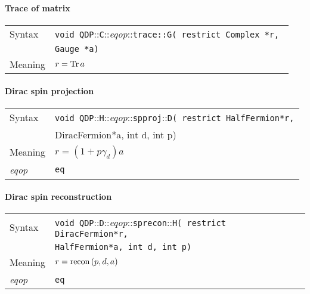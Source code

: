 \documentclass[12pt,letterpaper]{article}
\newcommand{\Tr}{\mathop{\rm Tr}}
\newcommand{\tComplex}{Complex}
\newcommand{\tColorMatrix}{Gauge}
\newcommand{\tHalfFermion}{HalfFermion}
\newcommand{\tDiracFermion}{DiracFermion}
\newcommand{\namespace}{QDP}
\newcommand{\ttdash}{{::}}
\newcommand{\extraarg}{}
\newcommand{\protoUnarySingleTypesQual}[5]{{\tt void \namespace}\ttdash{\tt #1}\ttdash{\it eqop}\ttdash#2\ttdash{\tt #3}{\tt ( restrict #4 *r, }\\
  & {\tt #5 *a\extraarg)}}
\begin{document}
\paragraph{Trace of matrix}

\begin{flushleft}
  \begin{tabular}{|l|l|}
  \hline
  Syntax      & \protoUnarySingleTypesQual{C}{\tt trace}{G}{\tComplex}{\tColorMatrix} \\
  \hline
  Meaning     & $r = \Tr a$ \\
  \hline
  \end{tabular}
\end{flushleft}

\paragraph{Dirac spin projection}

\begin{flushleft}
  \begin{tabular}{|l|l|}
  \hline
  Syntax      & {\tt void \namespace}\ttdash{\tt H}\ttdash{\it eqop}\ttdash{\tt spproj}\ttdash{\tt D( restrict \tHalfFermion *r,}\\
              & {\tDiracFermion *a, int d, int p\extraarg)} \\
  \hline
  Meaning     & $r = (1 + p\gamma_d)a$\\
  \hline
  {\it eqop}  & {\tt eq} \\
  \hline
  \end{tabular}
\end{flushleft}

\paragraph{Dirac spin reconstruction}

\begin{flushleft}
  \begin{tabular}{|l|l|}
  \hline
  Syntax      & {\tt void \namespace}\ttdash{\tt D}\ttdash{\it eqop}\ttdash{\tt sprecon}\ttdash{\tt H( restrict \tDiracFermion *r,}\\
              & {\tt \tHalfFermion *a, int d, int p\extraarg)} \\
  \hline
  Meaning     & $r = {\rm recon\,}(p,d,a)$\\
  \hline
  {\it eqop}  & {\tt eq} \\
  \hline
  \end{tabular}
\end{flushleft}
\end{document}
